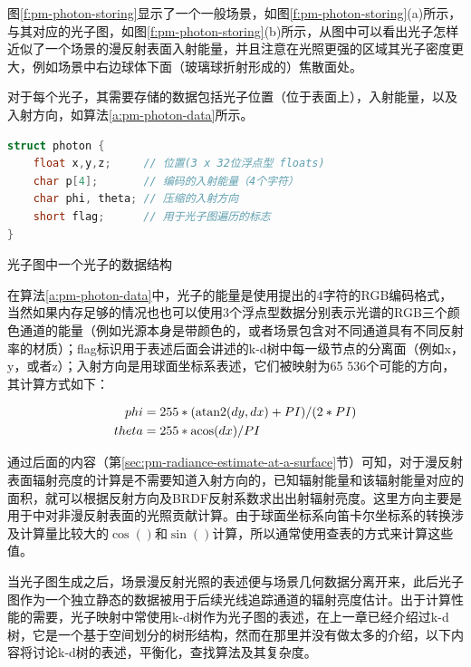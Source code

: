 图\ref{f:pm-photon-storing}显示了一个一般场景，如图\ref{f:pm-photon-storing}(a)所示，与其对应的光子图，如图\ref{f:pm-photon-storing}(b)所示，从图中可以看出光子怎样近似了一个场景的漫反射表面入射能量，并且注意在光照更强的区域其光子密度更大，例如场景中右边球体下面（玻璃球折射形成的）焦散面处。

对于每个光子，其需要存储的数据包括光子位置（位于表面上），入射能量，以及入射方向，如算法\ref{a:pm-photon-data}所示。

\begin{algorithm}
\begin{lstlisting}[language=C++, mathescape]
struct photon {
	float x,y,z;     // 位置(3 x 32位浮点型 floats)
	char p[4];       // 编码的入射能量（4个字符）
	char phi, theta; // 压缩的入射方向 
	short flag;      // 用于光子图遍历的标志
}
\end{lstlisting}
\caption{光子图中一个光子的数据结构}
\label{a:pm-photon-data}
\end{algorithm}

在算法\ref{a:pm-photon-data}中，光子的能量是使用\cite{a:Realpixels}提出的4字符的RGB编码格式，当然如果内存足够的情况也也可以使用3个浮点型数据分别表示光谱的RGB三个颜色通道的能量（例如光源本身是带颜色的，或者场景包含对不同通道具有不同反射率的材质）；flag标识用于表述后面会讲述的k-d树中每一级节点的分离面（例如x，y，或者z）；入射方向是用球面坐标系表述，它们被映射为65 536个可能的方向，其计算方式如下：

\begin{equation}
\begin{aligned}
	phi&=255*({\rm atan2}(dy,dx)+PI)/(2*PI)\\
	theta&=255*{\rm acos}(dx)/PI
\end{aligned}
\end{equation}

通过后面的内容（第\ref{sec:pm-radiance-estimate-at-a-surface}节）可知，对于漫反射表面辐射亮度的计算是不需要知道入射方向的，已知辐射能量和该辐射能量对应的面积，就可以根据反射方向及BRDF反射系数求出出射辐射亮度。这里方向主要是用于\cite{a:RenderingcausticsonnonLambertiansurfaces}中对非漫反射表面的光照贡献计算。由于球面坐标系向笛卡尔坐标系的转换涉及计算量比较大的$\cos()$和$\sin()$计算，所以通常使用查表的方式来计算这些值。

当光子图生成之后，场景漫反射光照的表述便与场景几何数据分离开来，此后光子图作为一个独立静态的数据被用于后续光线追踪通道的辐射亮度估计。出于计算性能的需要，光子映射中常使用k-d树作为光子图的表述，在上一章已经介绍过k-d树，它是一个基于空间划分的树形结构，然而在那里并没有做太多的介绍，以下内容将讨论k-d树的表述，平衡化，查找算法及其复杂度。




